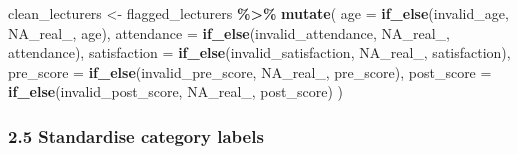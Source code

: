 \documentclass[11pt]{article}
\newenvironment{Shaded}{\begin{snugshade}}{\end{snugshade}}
\newcommand{\AttributeTok}[1]{\textcolor[rgb]{0.13,0.29,0.53}{#1}}
\newcommand{\ConstantTok}[1]{\textcolor[rgb]{0.56,0.35,0.01}{#1}}
\newcommand{\FunctionTok}[1]{\textcolor[rgb]{0.13,0.29,0.53}{\textbf{#1}}}
\newcommand{\NormalTok}[1]{#1}
\newcommand{\OtherTok}[1]{\textcolor[rgb]{0.56,0.35,0.01}{#1}}
\newcommand{\SpecialCharTok}[1]{\textcolor[rgb]{0.81,0.36,0.00}{\textbf{#1}}}
\begin{document}
\begin{Shaded}
\begin{Highlighting}[]
\NormalTok{clean\_lecturers }\OtherTok{\textless{}{-}}\NormalTok{ flagged\_lecturers }\SpecialCharTok{\%\textgreater{}\%}
  \FunctionTok{mutate}\NormalTok{(}
    \AttributeTok{age =} \FunctionTok{if\_else}\NormalTok{(invalid\_age, }\ConstantTok{NA\_real\_}\NormalTok{, age),}
    \AttributeTok{attendance =} \FunctionTok{if\_else}\NormalTok{(invalid\_attendance, }\ConstantTok{NA\_real\_}\NormalTok{, attendance),}
    \AttributeTok{satisfaction =} \FunctionTok{if\_else}\NormalTok{(invalid\_satisfaction, }\ConstantTok{NA\_real\_}\NormalTok{, satisfaction),}
    \AttributeTok{pre\_score =} \FunctionTok{if\_else}\NormalTok{(invalid\_pre\_score, }\ConstantTok{NA\_real\_}\NormalTok{, pre\_score),}
    \AttributeTok{post\_score =} \FunctionTok{if\_else}\NormalTok{(invalid\_post\_score, }\ConstantTok{NA\_real\_}\NormalTok{, post\_score)}
\NormalTok{  )}
\end{Highlighting}
\end{Shaded}

\hypertarget{standardise-category-labels}{%
\subsubsection{2.5 Standardise category
labels}\label{standardise-category-labels}}
\end{document}
